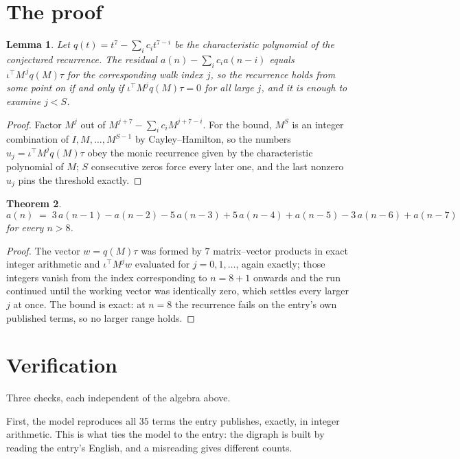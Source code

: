 \documentclass[11pt,a4paper]{article}
\theoremstyle{plain}
\newtheorem{theorem}{Theorem}
\newtheorem{lemma}[theorem]{Lemma}
\theoremstyle{definition}
\begin{document}
\section{The proof}

\begin{lemma}\label{lem:crit}
Let $q(t)=t^{7}-\sum_i c_it^{7-i}$ be the characteristic polynomial of the
conjectured recurrence. The residual $a(n)-\sum_ic_ia(n-i)$ equals
$\iota^{\!\top}M^{\,j}q(M)\tau$ for the corresponding walk index $j$, so the recurrence
holds from some point on if and only if $\iota^{\!\top}M^{j}q(M)\tau=0$ for all large $j$,
and it is enough to examine $j<S$.
\end{lemma}

\begin{proof}
Factor $M^{j}$ out of $M^{j+7}-\sum_ic_iM^{j+7-i}$. For the bound, $M^{S}$
is an integer combination of $I,M,\dots,M^{S-1}$ by Cayley--Hamilton, so the numbers
$u_j=\iota^{\!\top}M^{j}q(M)\tau$ obey the monic recurrence given by the characteristic
polynomial of $M$; $S$ consecutive zeros force every later one, and the last nonzero $u_j$
pins the threshold exactly.
\end{proof}

\begin{theorem}
\[
a(n)\;=\;3\,a(n-1) - a(n-2) - 5\,a(n-3) + 5\,a(n-4) + a(n-5) - 3\,a(n-6) + a(n-7)
\]
for every $n>8$.
\end{theorem}

\begin{proof}
The vector $w=q(M)\tau$ was formed by $7$ matrix--vector products in exact integer
arithmetic and $\iota^{\!\top}M^{j}w$ evaluated for $j=0,1,\dots$, again exactly; those
integers vanish from the index corresponding to $n=8+1$ onwards and the run continued
until the working vector was identically zero, which settles every larger $j$ at once. The bound is exact: at $n=8$ the recurrence fails on the entry's own published terms, so no larger range holds.
\end{proof}

\section{Verification}

Three checks, each independent of the algebra above.

First, the model reproduces all $35$ terms the entry publishes, exactly, in integer
arithmetic. This is what ties the model to the entry: the digraph is built by reading the
entry's English, and a misreading gives different counts.
\end{document}
